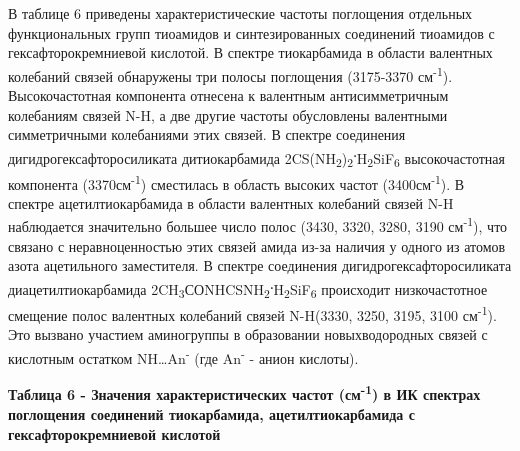 В таблице 6 приведены характеристические частоты поглощения отдельных
функциональных групп тиоамидов и синтезированных соединений тиоамидов с
гексафторокремниевой кислотой. В спектре тиокарбамида в области
валентных колебаний связей обнаружены три полосы поглощения (3175-3370
см\textsuperscript{-1}). Высокочастотная компонента отнесена к валентным
антисимметричным колебаниям связей N-H, а две другие частоты обусловлены
валентными симметричными колебаниями этих связей. В спектре соединения
дигидрогексафторосиликата дитиокарбамида
2CS(NH\textsubscript{2})\textsubscript{2}\textbf{\textsuperscript{.}}H\textsubscript{2}SiF\textsubscript{6}
высокочастотная компонента (3370см\textsuperscript{-1}) сместилась в
область высоких частот (3400см\textsuperscript{-1}). В спектре
ацетилтиокарбамида в области валентных колебаний связей N-H наблюдается
значительно большее число полос (3430, 3320, 3280, 3190
см\textsuperscript{-1}), что связано с неравноценностью этих связей
амида из-за наличия у одного из атомов азота ацетильного заместителя. В
спектре соединения дигидрогексафторосиликата диацетилтиокарбамида
2CH\textsubscript{3}СОNHCSNH\textsubscript{2}\textbf{\textsuperscript{.}}H\textsubscript{2}SiF\textsubscript{6}
происходит низкочастотное смещение полос валентных колебаний связей
N-H(3330, 3250, 3195, 3100 см\textsuperscript{-1}). Это вызвано участием
аминогруппы в образовании новыхводородных связей с кислотным остатком
NH\ldots An\textsuperscript{-} (где An\textsuperscript{-} - анион
кислоты).

\textbf{Таблица 6 - Значения характеристических частот
(см\textsuperscript{-1}) в ИК спектрах поглощения соединений
тиокарбамида, ацетилтиокарбамида с гексафторокремниевой кислотой}


